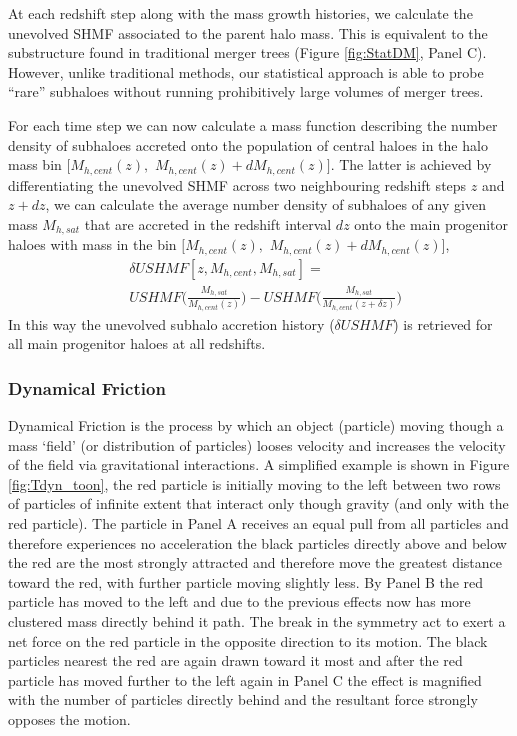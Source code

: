 At each redshift step along with the mass growth histories, we calculate the unevolved SHMF associated to the parent halo mass. This is equivalent to the substructure found in traditional merger trees (Figure \ref{fig:StatDM}, Panel C). However, unlike traditional methods, our statistical approach is able to probe ``rare'' subhaloes without running prohibitively large volumes of merger trees.

For each time step we can now calculate a mass function describing the number density of subhaloes accreted onto the population of central haloes in the halo mass bin $[M_{h,cent}(z),$ $M_{h,cent}(z) + dM_{h,cent}(z)]$. The latter is achieved by differentiating the unevolved SHMF across two neighbouring redshift steps $z$ and $z+dz$, we can calculate the average number density of subhaloes of any given mass $M_{h, sat}$ that are accreted in the redshift interval $dz$ onto the main progenitor haloes with mass in the bin $[M_{h,cent}(z),$ $M_{h,cent}(z) + dM_{h,cent}(z)]$,
\begin{equation}
\label{eqn:deltSHMF}
\begin{split}
&\delta USHMF[z, M_{h,cent},M_{h,sat}] =  \\
&USHMF\Big(\frac{M_{h,sat}}{M_{h,cent}(z)}\Big) - USHMF\Big(\frac{M_{h,sat}}{M_{h,cent}(z + \delta z)}\Big)
\end{split}
\end{equation}
In this way the unevolved subhalo accretion history ($\delta USHMF$) is retrieved for all main progenitor haloes at all redshifts.

\subsubsection{Dynamical Friction}
\label{subsub:DynF}
Dynamical Friction is the process by which an object (particle) moving though a mass `field' (or distribution of particles) looses velocity and increases the velocity of the field via gravitational interactions. A simplified example is shown in Figure \ref{fig:Tdyn_toon}, the red particle is initially moving to the left between two rows of particles of infinite extent that interact only though gravity (and only with the red particle). The particle in Panel A receives an equal pull from all particles and therefore experiences no acceleration the black particles directly above and below the red are the most strongly attracted and therefore move the greatest distance toward the red, with further particle moving slightly less. By Panel B the red particle has moved to the left and due to the previous effects now has more clustered mass directly behind it path. The break in the symmetry act to exert a net force on the red particle in the opposite direction to its motion. The black particles nearest the red are again drawn toward it most and after the red particle has moved further to the left again in Panel C the effect is magnified with the number of particles directly behind and the resultant force strongly opposes the motion. 


